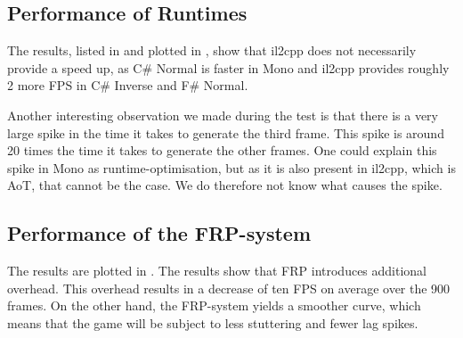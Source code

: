 
\subsection{Performance of Runtimes}
The results, listed in  and plotted in , show that il2cpp does not necessarily provide a speed up, as C\# Normal is faster in Mono and il2cpp provides roughly 2 more \gls{FPS} in C\# Inverse and F\# Normal.

Another interesting observation we made during the test is that there is a very large spike in the time it takes to generate the third frame. This spike is around 20 times the time it takes to generate the other frames. One could explain this spike in Mono as runtime-optimisation, but as it is also present in il2cpp, which is \gls{AoT}, that cannot be the case. We do therefore not know what causes the spike.

\begin{table}[H]
    \caption{Average framerate in Unity's two runtimes measured with 250 unites in the scene.}
    \label{tab:unity:ai:runtime}
\end{table}


\subsection{Performance of the FRP-system}
The results are plotted in . The results show that \gls{FRP} introduces additional overhead. This overhead results in a decrease of ten \gls{FPS} on average over the 900 frames. On the other hand, the \gls{FRP}-system yields a smoother curve, which means that the game will be subject to less stuttering and fewer lag spikes.

